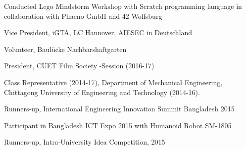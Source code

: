 \documentclass[a4paper, 12pt]{article}
\begin{document}
\begin{zitemize}
\item[\ding{86}]Conducted Lego Mindstorm Workshop with Scratch programming language in collaboration with Phaeno GmbH and 42 Wolfsburg
\item[\ding{86}] Vice President, iGTA, LC Hannover, AIESEC in Deutschland
\item[\ding{86}] Volunteer, Baulücke Nachbarshaftgarten
\item[\ding{86}] President, CUET Film Society -Session (2016-17)
\item[\ding{86}] Class Representative (2014-17), Department of Mechanical Engineering, Chittagong University of Engineering and Technology (2014-16).
\item[\ding{86}] Runners-up, International Engineering Innovation Summit Bangladesh 2015
\item[\ding{86}] Participant in  Bangladesh ICT Expo 2015 with Humanoid Robot SM-1805
\item[\ding{86}] Runners-up, Intra-University Idea Competition, 2015
\end{zitemize}
\end{document}
